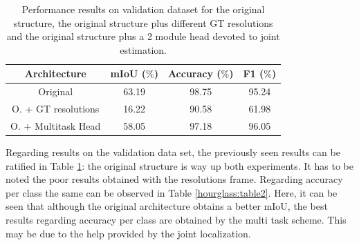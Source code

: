 \begin{table}[h!]
  \begin{center}
    
    \begin{tabular}{|c|c|c|c|} %
      \textbf{Architecture} & \textbf{mIoU ($\%$)} & \textbf{Accuracy ($\%$)} & \textbf{F1 ($\%$)} \\
      \hline
      Original & 63.19 & 98.75 & 95.24\\
      \hline
      O. + GT resolutions & 16.22 & 90.58 & 61.98\\  
      \hline
      O. + Multitask Head & 58.05 & 97.18 & 96.05\\
    \end{tabular}
    \caption{Performance results on validation dataset for the original structure, the original structure plus different GT resolutions and the original structure plus a 2 module head devoted to joint estimation.}
    \label{hourglass:table1}
  \end{center}
\end{table}

Regarding results on the validation data set, the previously seen results can be ratified in Table \ref{hourglass:table1}: the original structure is way up both experiments. It has to be noted the poor results obtained with the resolutions frame. Regarding accuracy per class the same can be observed in Table \ref{hourglass:table2}. Here, it can be seen that although the original architecture obtains a better mIoU, the best results regarding accuracy per class are obtained by the multi task scheme. This may be due to the help provided by the joint localization. \\

